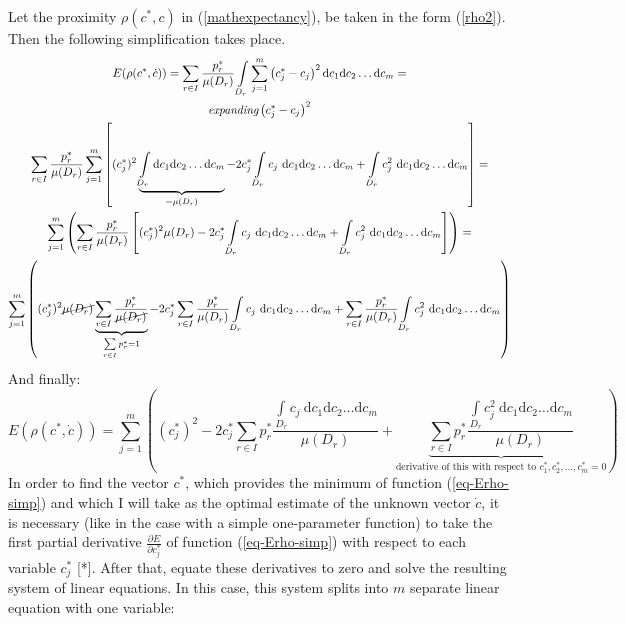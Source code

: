 \documentclass[a4paper]{article}
\numberwithin{equation}{subsection}
\begin{document}
Let the proximity $\rho(c^{*},c)$ in (\ref{mathexpectancy}), be taken in the form (\ref{rho2}). Then the following simplification takes place.
\begin{gather}
\nonumber
E(\rho(c^{*},\dot{c}))=\sum\limits_{r \in I} \frac{p_{r}^{*}}{\mu(D_{r})} \int\limits_{D_{r}}\sum\limits_{j=1}^{m} \left( c_{j}^{*}-c_{j} \right)^{2}\mathrm{d}c_{1}\mathrm{d}c_{2}\dots \mathrm{d}c_{m} = \\
\nonumber
\textit{expanding} \left( c_{j}^{*}-c_{j} \right)^{2} \\
\nonumber
\sum\limits_{r \in I} \frac{p_{r}^{*}}{\mu(D_{r})} \sum\limits_{j=1}^{m} \left[ (c_{j}^{*})^{2} \underbrace{\int\limits_{D_{r}} \mathrm{d}c_{1}\mathrm{d}c_{2}\dots \mathrm{d}c_{m}}_{{=\mu(D_{r})}} - 2c_{j}^{*} \int\limits_{D_{r}} c_{j} \  \mathrm{d}c_{1}\mathrm{d}c_{2}\dots \mathrm{d}c_{m} + \int\limits_{D_{r}} c_{j}^{2} \  \mathrm{d}c_{1}\mathrm{d}c_{2}\dots \mathrm{d}c_{m}\right]= \\
\nonumber
\sum\limits_{j=1}^{m} \left( \sum\limits_{r \in I} \frac{p_{r}^{*}}{\mu(D_{r})} \left[ (c_{j}^{*})^{2} \mu(D_{r})-2c_{j}^{*} \int\limits_{D_{r}} c_{j} \  \mathrm{d}c_{1}\mathrm{d}c_{2}\dots \mathrm{d}c_{m} + \int\limits_{D_{r}} c_{j}^{2} \  \mathrm{d}c_{1}\mathrm{d}c_{2}\dots \mathrm{d}c_{m} \right] \right) = \\ 
\sum\limits_{j=1}^{m} \left( (c_{j}^{*})^{2} \cancel{\mu(D_{r})} \underbrace{\sum\limits_{r \in I} \frac{p_{r}^{*}}{\cancel{\mu(D_{r})}}}_{\sum\limits_{r \in I}p_{r}^{*} = 1} - 2c_{j}^{*} \sum\limits_{r \in I}\frac{p_{r}^{*}}{\mu(D_{r})} \int\limits_{D_{r}} c_{j} \  \mathrm{d}c_{1}\mathrm{d}c_{2}\dots \mathrm{d}c_{m} + \sum\limits_{r \in I}\frac{p_{r}^{*}}{\mu(D_{r})} \int\limits_{D_{r}} c_{j}^{2} \  \mathrm{d}c_{1}\mathrm{d}c_{2}\dots \mathrm{d}c_{m} \right)
\end{gather}
And finally:
\begin{equation}
E(\rho(c^{*},\dot{c}))= \sum\limits_{j=1}^{m} \left( (c_{j}^{*})^{2} - 2c_{j}^{*} \sum\limits_{r \in I} p_{r}^{*} \frac{\int\limits_{D_{r}} c_{j} \  \mathrm{d}c_{1}\mathrm{d}c_{2}\dots \mathrm{d}c_{m}}{\mu(D_{r})} + \underbrace{\sum\limits_{r \in I} p_{r}^{*} \frac{\int\limits_{D_{r}} c_{j}^{2} \  \mathrm{d}c_{1}\mathrm{d}c_{2}\dots \mathrm{d}c_{m}}{\mu(D_{r})}}_{\text{derivative of this with respect to } c_{1}^{*}, c_{2}^{*},\dots,c_{m}^{*} = 0} \right) \label{eq-Erho-simp}
\end{equation}
In order to find the vector $c^{*}$, which provides the minimum of function (\ref{eq-Erho-simp}) and which I will take as the optimal estimate of the unknown vector $\dot{c}$, it is necessary (like in the case with a simple one-parameter function) to take the first partial derivative $\frac{\partial E}{\partial c_{j}^{*}}$ of function (\ref{eq-Erho-simp}) with respect to each variable $c_{j}^{*}$ [*]. After that, equate these derivatives to zero and solve the resulting system of linear equations. In this case, this system splits into $m$ separate linear equation with one variable:
\end{document}
